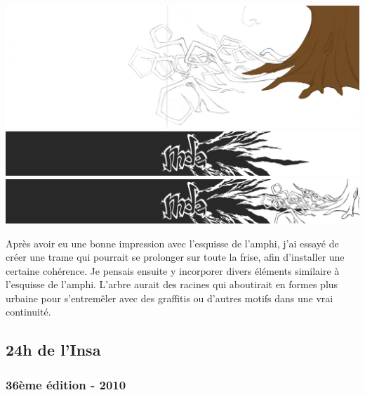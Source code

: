         \begin{center}
            \includegraphics[width=\textwidth]{img/arbre.png}
            \includegraphics[width=\textwidth]{img/mde.png}
            \includegraphics[width=\textwidth]{img/mde+arbre.png}
        \end{center}
        
                    Après avoir eu une bonne impression avec l'esquisse de l'amphi, j'ai essayé de créer une trame qui pourrait se prolonger sur toute la frise, afin d'installer une certaine cohérence.
Je pensais ensuite y incorporer divers éléments similaire à l'esquisse de l'amphi.
            L'arbre aurait des racines qui aboutirait en formes plus urbaine pour s'entremêler avec des graffitis ou d'autres motifs dans une vrai continuité.
            
    \subsection{24h de l'Insa}
    
        \subsubsection{36ème édition - 2010}
    
